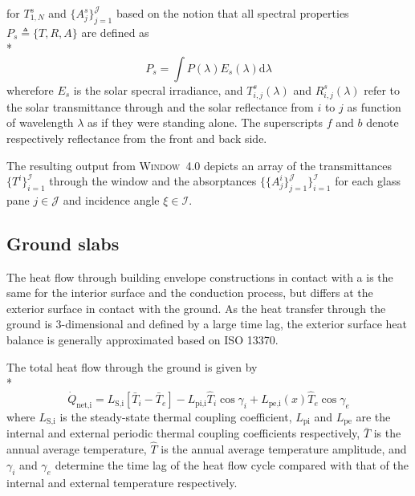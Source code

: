 for $T_{1,N}^{s}$ and $\{A_{j}^{s}\}_{j=1}^{\mathcal{J}}$ based on the notion that all spectral properties $P_{s} \triangleq \{ T, R, A \}$ are defined as \\*
\begin{equation}
P_{s} = \int P \left(\lambda\right) E_{s} \left(\lambda\right) \mbox{d} \lambda
\end{equation}
wherefore $E_{s}$ is the solar specral irradiance, and $T_{i,j}^{s}\left(\lambda\right)$ and $R_{i,j}^{s}\left(\lambda\right)$ refer to the solar transmittance through and the solar reflectance from $i$ to $j$ as function of wavelength $\lambda$ as if they were standing alone. The superscripts $f$ and $b$ denote respectively reflectance from the front and back side.

The resulting output from \mbox{\textsc{Window} 4.0} depicts an array of the transmittances $\{T^{i}\}_{i=1}^{\mathcal{I}}$ through the window and the absorptances $\{\{A_{j}^{i}\}_{j=1}^{\mathcal{J}}\}_{i=1}^{\mathcal{I}}$ for each glass pane $j \in \mathcal{J}$ and incidence angle $\xi \in \mathcal{I}$.

\subsection{Ground slabs}

The heat flow through building envelope constructions in contact with a  is the same for the interior surface and the  conduction process, but differs at the exterior surface in contact with the ground. As the heat transfer through the ground is 3-dimensional and defined by a large time lag, the exterior surface heat balance is generally approximated based on ISO 13370.

The total heat flow through the ground is given by \\*
\begin{equation}
\dot{Q}_{\textrm{net,i}} = L_{\textrm{S,i}} \left[ \bar{T}_{i} - \bar{T}_{e} \right] - L_{\textrm{pi,i}} \hat{T}_{i} \cos \gamma_{i} + L_{\textrm{pe,i}}(x) \hat{T}_{e} \cos \gamma_{e}
\end{equation}
where $L_{\textrm{S,i}}$ is the steady-state thermal coupling coefficient, $L_{\textrm{pi}}$ and $L_{\textrm{pe}}$ are the internal and external periodic thermal coupling coefficients respectively, $\bar{T}$ is the annual average temperature, $\hat{T}$ is the annual average temperature amplitude, and $\gamma_{i}$ and $\gamma_{e}$ determine the time lag of the heat flow cycle compared with that of the internal and external temperature respectively.


